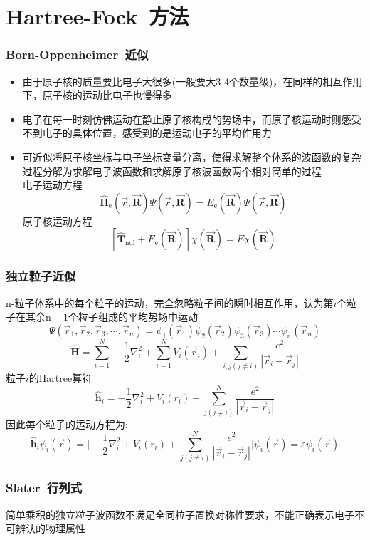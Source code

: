 {\section{\rm{Hartree-Fock~}方法}
\frame
{
	\frametitle{\textrm{Born-Oppenheimer~}近似}
	\begin{itemize}
		\item 由于原子核的质量要比电子大很多(一般要大3-4个数量级)，在同样的相互作用下，原子核的运动比电子也慢得多
		\item 电子在每一时刻仿佛运动在静止原子核构成的势场中，而原子核运动时则感受不到电子的具体位置，感受到的是运动电子的平均作用力
		\item 可近似将原子核坐标与电子坐标变量分离，使得求解整个体系的波函数的复杂过程分解为求解电子波函数和求解原子核波函数两个相对简单的过程\\
			电子运动方程$$\hat{\mathbf H}_{\mathrm e}(\vec r,\vec{\mathbf R})\Psi(\vec r,\vec{\mathbf R})=E_{\mathrm e}(\vec{\mathbf R})\Psi(\vec r,\vec{\mathbf R})$$
			原子核运动方程$$[\hat{\mathbf T}_{\mathrm{nul}}+E_{\mathrm e}(\vec{\mathbf R})]\chi(\vec{\mathbf R})=E\chi(\vec{\mathbf R})$$
	\end{itemize}
}

\frame
{
	\frametitle{独立粒子近似}
	\textrm{n-}粒子体系中的每个粒子的运动，完全忽略粒子间的瞬时相互作用，认为第$i$个粒子在其余$\mathrm{n}-1$个粒子组成的平均势场中运动
	$$\Psi(\vec r_1,\vec r_2,\vec r_3,\cdots,\vec r_n)=\psi_1(\vec r_1)\psi_2(\vec r_2)\psi_3(\vec r_3)\cdots\psi_n(\vec r_n)$$
	$$\hat{\mathbf H}=\sum_{i=1}^N-\dfrac{1}{2}\nabla_i^2+\sum_{i=1}^NV_i(\vec r_i)+\sum_{i,j(j\neq i)}\dfrac{e^2}{|\vec r_i-\vec r_j|}$$
	粒子$i$的\textrm{Hartree}算符
	$$\hat{\mathbf h}_i=-\dfrac{1}{2}\nabla_i^2+V_i(r_i)+\sum_{j(j\neq i)}^N\dfrac{e^2}{|\vec r_i-\vec r_j|}$$
	因此每个粒子的运动方程为:
	$$\hat{\mathbf h}_i\psi_i(\vec r)=\bigg[-\dfrac{1}{2}\nabla_i^2+V_i(r_i)+\sum_{j(j\neq i)}^N\dfrac{e^2}{|\vec r_i-\vec r_j|}\bigg]\psi_i(\vec r)=\varepsilon\psi_i(\vec r)$$ 
}

\frame
{
	\frametitle{\textrm{Slater~}行列式}
	简单乘积的独立粒子波函数不满足全同粒子置换对称性要求，不能正确表示电子不可辨认的物理属性
	
}}
